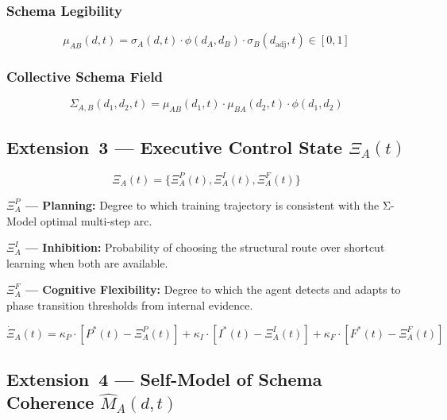 \subsubsection{Schema Legibility}
\begin{equation}\label{eq:schema-legibility}
\mu_{AB}(d,t) = \sigma_A(d,t) \cdot \phi(d_A, d_B) \cdot \sigma_B(d_{\text{adj}},t) \in [0,1]
\end{equation}

\subsubsection{Collective Schema Field}
\begin{equation}\label{eq:collective-field}
\Sigma_{A,B}(d_1,d_2,t) = \mu_{AB}(d_1,t) \cdot \mu_{BA}(d_2,t) \cdot \phi(d_1,d_2)
\end{equation}

\subsection{Extension~3 --- Executive Control State \texorpdfstring{$\Xi_A(t)$}{Xi\_A(t)}}\label{sec:executive}

\begin{equation}\label{eq:executive-state}
\Xi_A(t) = \{\Xi_A^P(t), \Xi_A^I(t), \Xi_A^F(t)\}
\end{equation}

\textbf{$\Xi_A^P$ --- Planning:} Degree to which training trajectory is
consistent with the Σ-Model optimal multi-step arc.

\textbf{$\Xi_A^I$ --- Inhibition:} Probability of choosing the structural
route over shortcut learning when both are available.

\textbf{$\Xi_A^F$ --- Cognitive Flexibility:} Degree to which the agent
detects and adapts to phase transition thresholds from internal evidence.

\begin{equation}\label{eq:executive-ode}
\dot{\Xi}_A(t) = \kappa_P \cdot [P^*(t) - \Xi_A^P(t)] + \kappa_I \cdot [I^*(t) - \Xi_A^I(t)] + \kappa_F \cdot [F^*(t) - \Xi_A^F(t)] %
\end{equation}

\subsection{Extension~4 --- Self-Model of Schema Coherence \texorpdfstring{$\hat{M}_A(d,t)$}{M-hat\_A(d,t)}}\label{sec:metacognition}

